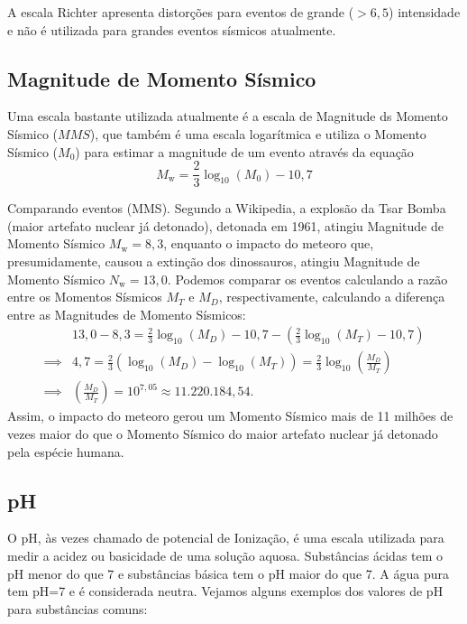 A escala Richter apresenta distorções para eventos de grande ($>6{,}5$) intensidade e não é utilizada para grandes eventos sísmicos atualmente.

\subsection{Magnitude de Momento Sísmico}

Uma escala bastante utilizada atualmente é a escala de Magnitude ds Momento Sísmico ($MMS$), que também é uma escala logarítmica e utiliza o Momento Sísmico ($M_0$) para estimar a magnitude de um evento através da equação
$$
M_{\mathrm {w} }={\frac{2}{3}}\log_{10}\left(M_{0}\right)-10,7
$$

\begin{example}{Comparando eventos (MMS).}
Segundo a Wikipedia, a explosão da Tsar Bomba (maior artefato nuclear já detonado), detonada em 1961, atingiu Magnitude de Momento Sísmico $M_{\mathrm w} = 8{,}3$, enquanto o impacto do meteoro que, presumidamente, causou a extinção dos dinossauros, atingiu Magnitude de Momento Sísmico $N_{\mathrm w} = 13{,}0$. Podemos comparar os eventos calculando a razão entre os Momentos Sísmicos $M_T$ e $M_D$, respectivamente, calculando a diferença entre as Magnitudes de Momento Sísmicos:
\begin{align*}
&13{,}0-8{,}3 = {\frac{2}{3}}\log_{10}\left(M_{D}\right)-10,7-\left( {\frac{2}{3}}\log_{10}\left(M_{T}\right)-10,7\right)\\
\implies & 4{,}7 = {\frac{2}{3}}\left(\log_{10}\left(M_{D}\right)-\log_{10}\left(M_{T}\right)\right) =  {\frac{2}{3}}\log_{10}\left(\frac{M_D}{M_T}\right)\\
\implies & \left(\frac{M_D}{M_T}\right) = 10^{7{,}05} \approx 11.220.184{,}54.
\end{align*} 
Assim, o impacto do meteoro gerou um Momento Sísmico mais de 11 milhões de vezes maior do que o Momento Sísmico do maior artefato nuclear já detonado pela espécie humana. 
\end{example}

\subsection{pH}

O pH, às vezes chamado de potencial de Ionização, é uma escala utilizada para medir a acidez ou basicidade de uma solução aquosa. Substâncias ácidas tem o pH menor do que 7 e substâncias básica tem o pH maior do que 7. A água pura tem pH=7 e é considerada neutra. Vejamos alguns exemplos dos valores de pH  para substâncias comuns:


